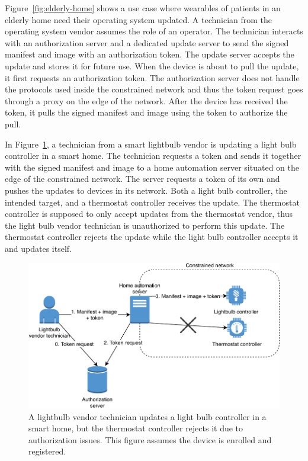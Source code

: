 \documentclass[0-thesis.tex]{subfiles}
\begin{document}
Figure~\ref{fig:elderly-home} shows a use case where wearables of patients in an elderly
home need their operating system updated. A technician from the operating system vendor
assumes the role of an operator. The technician interacts with an authorization server and
a dedicated update server to send the signed manifest and image with an authorization
token. The update server accepts the update and stores it for future use. When the device
is about to pull the update, it first requests an authorization token. The authorization
server does not handle the protocols used inside the constrained network and thus the
token request goes through a proxy on the edge of the network. After the device has
received the token, it pulls the signed manifest and image using the token to authorize
the pull.

In Figure~\ref{fig:smart-home}, a technician from a smart lightbulb vendor is updating a
light bulb controller in a smart home. The technician requests a token and sends it
together with the signed manifest and image to a home automation server situated on the
edge of the constrained network. The server requests a token of its own and pushes the
updates to devices in its network. Both a light bulb controller, the intended target, and
a thermostat controller receives the update. The thermostat controller is supposed to only
accept updates from the thermostat vendor, thus the light bulb vendor technician is
unauthorized to perform this update. The thermostat controller rejects the update while
the light bulb controller accepts it and updates itself.

\begin{figure}[t]
    \caption[A lightbulb vendor technician updates a light bulb controller in a smart
    home.]
        {A lightbulb vendor technician updates a light bulb controller in a smart
                home, but the thermostat controller rejects it due to authorization
                issues. This figure assumes the device is enrolled and registered.}
    \label{fig:smart-home}
    \includegraphics{images/use-case-smart-home.pdf}
\end{figure}
\end{document}
